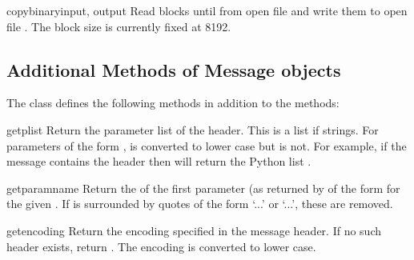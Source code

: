 \begin{funcdesc}{copybinary}{input, output}
Read blocks until \EOF{} from open file  and write them to
open file .  The block size is currently fixed at 8192.
\end{funcdesc}


\begin{seealso}
\end{seealso}


\subsection{Additional Methods of Message objects}

The  class defines the following methods in
addition to the  methods:

\begin{methoddesc}{getplist}{}
Return the parameter list of the  header.  This is
a list if strings.  For parameters of the form
,  is converted to lower case but
 is not.  For example, if the message contains the header
 then
 will return the Python list \code{['spam=1',
'spam=2', 'Spam']}.
\end{methoddesc}

\begin{methoddesc}{getparam}{name}
Return the  of the first parameter (as returned by
 of the form  for the
given .  If  is surrounded by quotes of the form
`\code{<}...\code{>}' or `...', these are removed.
\end{methoddesc}

\begin{methoddesc}{getencoding}{}
Return the encoding specified in the 
message header.  If no such header exists, return .  The
encoding is converted to lower case.
\end{methoddesc}

